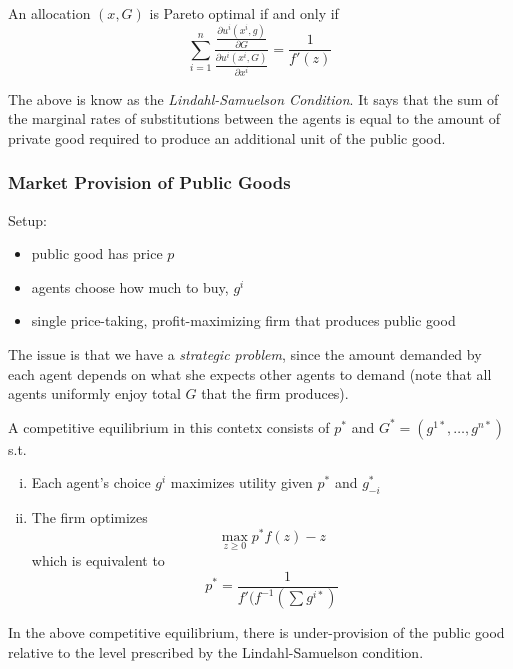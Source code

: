 \begin{definition}
  An allocation $(x, G)$ is Pareto optimal if and only if
  \[
  \sum_{i=1}^n 
  \frac{
    \frac{\partial u^i(x^i, g)}{\partial G}
  } {
    \frac{\partial u^i(x^i, G)}{\partial x^i}
  }
   = \frac{1}{f'(z)}
  \]
\end{definition}

The above is know as the \textit{Lindahl-Samuelson Condition}. It says
that the sum of the marginal rates of substitutions between the agents
is equal to the amount of private good required to produce an
additional unit of the public good.




\subsubsection{Market Provision of Public Goods}

Setup:
\begin{itemize}
\item public good has price $p$
\item agents choose how much to buy, $g^i$
\item single price-taking, profit-maximizing firm that produces public
  good
\end{itemize}

The issue is that we have a \textit{strategic problem}, since the
amount demanded by each agent depends on what she expects other agents
to demand (note that all agents uniformly enjoy total $G$ that the
firm produces).

\begin{definition}
  A competitive equilibrium in this contetx consists of $p^*$ and $G^*
  = (g^{1*}, \dots, g^{n*})$ s.t.
  \begin{enumerate}[(i)]
  \item Each agent's choice $g^i$ maximizes utility given $p^*$ and
    $g^*_{-i}$
  \item The firm optimizes
    \[
    \max_{z \geq 0} p^* f(z) - z
    \]
    which is equivalent to
    \[
    p^* = \frac{1}{f'(f^{-1}(\sum g^{i*})}
    \]
  \end{enumerate}

\end{definition}


\begin{prop}
  In the above competitive equilibrium, there is under-provision of
  the public good relative to the level prescribed by the Lindahl-Samuelson
  condition.
\end{prop}

